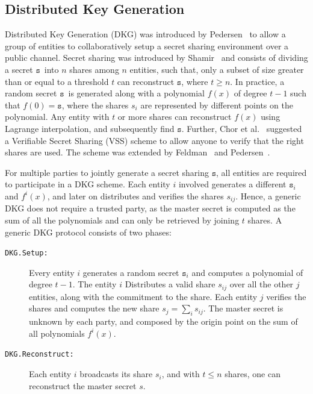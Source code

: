 \documentclass{llncs}
\newcommand{\K}{\ensuremath{\mathtt{s}}}
\begin{document}
\subsection{Distributed Key Generation}
Distributed Key Generation (DKG) was introduced by Pedersen~\cite{Pedersen:1991:NIS:646756.705507} to allow a group of entities to collaboratively setup a secret sharing environment over a public channel.
Secret sharing was introduced by Shamir~\cite{Shamir1979} and consists of dividing a secret \K\ into $n$ shares among $n$ entities, such that, only a subset of size greater than or equal to a threshold $t$ can reconstruct \K, where $t \geq n$. In practice, a random secret \K\ is generated along with a polynomial $f(x)$ of degree $t-1$ such that $f(0)=\K$, where the shares $s_i$ are represented by different points on the polynomial. Any entity with $t$ or more shares can reconstruct $f(x)$ using Lagrange interpolation, and subsequently find $\K$. Further, Chor et al.~\cite{DBLP:conf/focs/ChorGMA85} suggested a Verifiable Secret Sharing (VSS) scheme to allow anyone to verify that the right shares are used. The scheme was extended by Feldman~\cite{Feldman:1987:PSN:1382440.1383000} and Pedersen~\cite{Pedersen:1991:NIS:646756.705507}. 

For multiple parties to jointly generate a secret sharing \K, all entities are required to participate in a DKG scheme. Each entity $i$ involved generates a different $\K_i$ and $f^i(x)$, and later on distributes and verifies the shares $s_{ij}$. Hence, a generic DKG does not require a trusted party, as the master secret is computed as the sum of all the polynomials and can only be retrieved by joining $t$ shares. A generic DKG protocol consists of two phases:

\begin{description}
    \item[\texttt{DKG.Setup:}] Every entity $i$ generates a random secret $\K_i$ and computes a polynomial of degree $t-1$. The entity $i$ Distributes a valid share $s_{ij}$ over all the other $j$ entities, along with the commitment to the share. Each entity $j$ verifies the shares and computes the new share $s_j = \sum_i s_{ij}$. The master secret is unknown by each party, and composed by the origin point on the sum of all polynomials $f^i(x)$.
    \item[\texttt{DKG.Reconstruct:}] Each entity $i$ broadcasts its share $s_i$, and with $t \leq n$ shares, one can reconstruct the master secret $s$.
\end{description}
\end{document}
